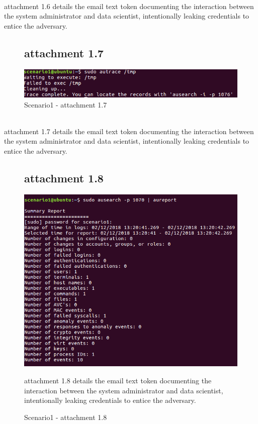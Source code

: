 \documentclass[grad,lot,lof,11pt,oneside,onehalfspace]{RUthesis}
\begin{document}
\\attachment 1.6 details the email text token documenting the interaction between the system administrator and data scientist, intentionally leaking credentials to entice the adversary.  
\begin{figure}[!hbt]
	\subsection{attachment 1.7}
	\centering
	\includegraphics[width=1.1\linewidth]{"Images/Chapter 7/s7"}
	\caption{Scenario1 - attachment 1.7}
	\label{fig:s7}
\end{figure}
\\attachment 1.7 details the email text token documenting the interaction between the system administrator and data scientist, intentionally leaking credentials to entice the adversary.  
\begin{figure}[!hbt]
	\subsection{attachment 1.8}
	\centering
	\includegraphics[width=0.9\linewidth]{"Images/Chapter 7/s8"}
	\caption{Scenario1 - attachment 1.8}
	\label{fig:s8}
	attachment 1.8 details the email text token documenting the interaction between the system administrator and data scientist, intentionally leaking credentials to entice the adversary.  
\end{figure}
\end{document}
